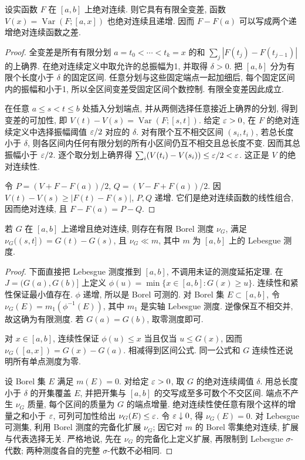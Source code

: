 \begin{lemma}\label{ra:c9:variation}
设实函数 $F$ 在 $[a,b]$ 上绝对连续. 则它具有有限全变差, 函数 $V(x)=\operatorname{Var}(F;[a,x])$ 也绝对连续且递增. 因而 $F-F(a)$ 可以写成两个递增绝对连续函数之差.
\end{lemma}
\begin{proof}
全变差是所有有限分划 $a=t_0<\cdots<t_k=x$ 的和 $\sum_j|F(t_j)-F(t_{j-1})|$ 的上确界. 在绝对连续定义中取允许的总振幅为1, 并取得 $\delta>0$. 把 $[a,b]$ 分为有限个长度小于 $\delta$ 的固定区间. 任意分划与这些固定端点一起加细后, 每个固定区间内的振幅和小于1, 所以全区间变差受固定区间个数控制. 有限全变差因此成立.

在任意 $a\le s<t\le b$ 处插入分划端点, 并从两侧选择任意接近上确界的分划, 得到变差的可加性, 即 $V(t)-V(s)=\operatorname{Var}(F;[s,t])$. 给定 $\varepsilon>0$, 在 $F$ 的绝对连续定义中选择振幅阈值 $\varepsilon/2$ 对应的 $\delta$. 对有限个互不相交区间 $(s_i,t_i)$, 若总长度小于 $\delta$, 则各区间内任何有限分划的所有小区间仍互不相交且总长度不变. 因而其总振幅小于 $\varepsilon/2$. 逐个取分划上确界得 $\sum_i(V(t_i)-V(s_i))\le\varepsilon/2<\varepsilon$. 这正是 $V$ 的绝对连续性.

令 $P=(V+F-F(a))/2$, $Q=(V-F+F(a))/2$. 因 $V(t)-V(s)\ge|F(t)-F(s)|$, $P,Q$ 递增. 它们是绝对连续函数的线性组合, 因而绝对连续, 且 $F-F(a)=P-Q$.
\end{proof}

\begin{lemma}\label{ra:c9:stieltjes}
若 $G$ 在 $[a,b]$ 上递增且绝对连续, 则存在有限 Borel 测度 $\nu_G$, 满足 $\nu_G((s,t])=G(t)-G(s)$, 且 $\nu_G\ll m$, 其中 $m$ 为 $[a,b]$ 上的 Lebesgue 测度.
\end{lemma}
\begin{proof}
下面直接把 Lebesgue 测度推到 $[a,b]$, 不调用未证的测度延拓定理. 在 $J=(G(a),G(b)]$ 上定义
$\phi(u)=\min\{x\in[a,b]:G(x)\ge u\}$. 连续性和紧性保证最小值存在. $\phi$ 递增, 所以是 Borel 可测的. 对 Borel 集 $E\subset[a,b]$, 令 $\nu_G(E)=m_1(\phi^{-1}(E))$, 其中 $m_1$ 是实轴 Lebesgue 测度. 逆像保互不相交并, 故这确为有限测度. 若 $G(a)=G(b)$, 取零测度即可.

对 $x\in[a,b]$, 连续性保证 $\phi(u)\le x$ 当且仅当 $u\le G(x)$, 因而 $\nu_G([a,x])=G(x)-G(a)$. 相减得到区间公式. 同一公式和 $G$ 连续性还说明所有单点测度为零.

设 Borel 集 $E$ 满足 $m(E)=0$. 对给定 $\varepsilon>0$, 取 $G$ 的绝对连续阈值 $\delta$. 用总长度小于 $\delta$ 的开集覆盖 $E$, 并把开集与 $[a,b]$ 的交写成至多可数个不交区间. 端点不产生 $\nu_G$ 质量, 每个区间的质量为 $G$ 的端点增量. 绝对连续性使任意有限个这样的增量之和小于 $\varepsilon$, 可列可加性给出 $\nu_G(E)\le\varepsilon$. 令 $\varepsilon\downarrow0$, 得 $\nu_G(E)=0$. 对 Lebesgue 可测集, 利用 Borel 测度的完备化扩展 $\nu_G$; 因它对 $m$ 的 Borel 零集绝对连续, 扩展与代表选择无关. 严格地说, 先在 $\nu_G$ 的完备化上定义扩展, 再限制到 Lebesgue $\sigma$-代数; 两种测度各自的完整 $\sigma$-代数不必相同.
\end{proof}

